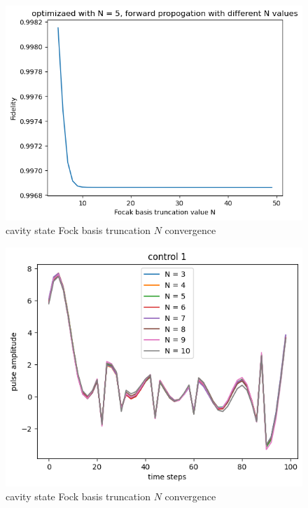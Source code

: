 \documentclass[12pt]{report}
\begin{document}
\begin{figure}[H]
    \centering
    \includegraphics[width=0.95\linewidth]{vac2coherent_N_convergence.png}
    \caption{cavity state Fock basis truncation $N$ convergence}
    \label{fig:vac2coherent_N_convergence}
\end{figure}

\begin{figure}[H]
    \centering
    \includegraphics[width=0.95\linewidth]{check_convergence_control1.png}
    \caption{cavity state Fock basis truncation $N$ convergence}
    \label{fig:check_convergence_control1}
\end{figure}
\end{document}
